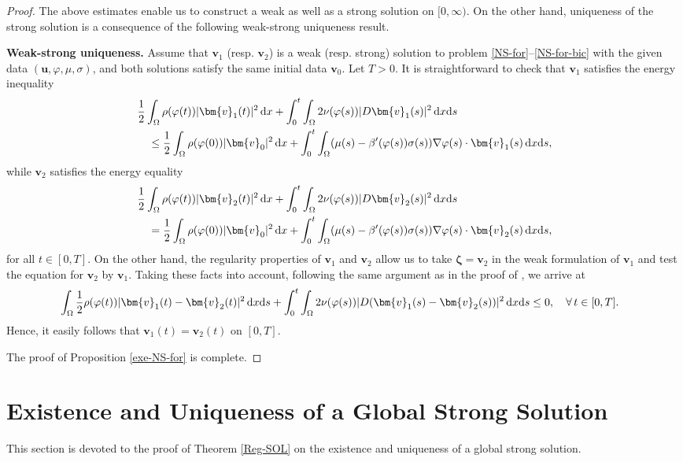 \documentclass[11pt,reqno]{amsart}
\def\d{{\rm d}}
\def\uu{\bm{u}}
\def\vv{\bm{v}}
\begin{document}
\begin{proof}
The above estimates enable us to construct a weak as well as a strong solution on $[0,\infty)$.
On the other hand, uniqueness of the strong solution is a consequence of the following weak-strong uniqueness result.
\smallskip

\textbf{Weak-strong uniqueness.} Assume that $\vv_1$ (resp. $\vv_2$) is a weak (resp. strong) solution to problem \eqref{NS-for}--\eqref{NS-for-bic} with the given data $(\uu,\varphi,\mu,\sigma)$, and both solutions satisfy the same initial data $\vv_0$. Let $T>0$. It is straightforward to check that $\vv_1$ satisfies the energy inequality
%
\begin{align}
&\frac12  \int_\Omega  \rho (\varphi(t))|\vv_1(t)|^2\,\d x
+ \int_0^t \int_\Omega  2\nu(\varphi(s)) |D\bm{v}_1(s)|^2\,\d x\mathrm{d}s
\notag\\
&\quad \leq \frac12  \int_\Omega  \rho (\varphi(0))|\vv_0|^2\,\d x+  \int_0^t\int_\Omega  (\mu(s) -\beta'(\varphi(s)) \sigma(s))\nabla\varphi (s)\cdot \vv_1(s)\, \d x\mathrm{d}s,
\notag
\end{align}
%
while $\vv_2$ satisfies the energy equality
%
\begin{align}
&\frac12  \int_\Omega  \rho (\varphi(t))|\vv_2(t)|^2\,\d x
+ \int_0^t \int_\Omega  2\nu(\varphi(s)) |D\bm{v}_2(s)|^2\,\d x\mathrm{d}s
\notag\\
&\quad
= \frac12  \int_\Omega  \rho (\varphi(0))|\vv_0|^2\,\d x+ \int_0^t\int_\Omega   (\mu(s) -\beta'(\varphi(s)) \sigma(s))\nabla\varphi(s) \cdot \vv_2(s)\, \d x\mathrm{d}s,
\notag
\end{align}
%
for all $t\in [0,T]$.
On the other hand, the regularity properties of $\vv_1$ and $\vv_2$ allow us to take $\bm{\zeta}=\vv_2$ in the weak formulation of $\vv_1$ and test the equation for $\vv_2$ by $\vv_1$. Taking these facts into account, following the same argument as in the proof of \cite[Theorem 4.1]{AGG2023}, we arrive at
%
\begin{align}
&\int_\Omega \frac12\rho(\varphi(t))|\vv_1(t)-\vv_2(t)|^2\,\d x\d s
+ \int_0^t\int_\Omega 2\nu(\varphi(s))|D(\vv_1(s)-\vv_2(s))|^2\,\d x\d s
\leq 0, \quad \forall\, t\in [0,T].
\notag
\end{align}
%
Hence, it easily follows that $\vv_1(t)=\vv_2(t)$ on $[0,T]$.

The proof of Proposition \ref{exe-NS-for} is complete.
\end{proof}


\section{Existence and Uniqueness of a Global Strong Solution}
\label{glo-strong}
\setcounter{equation}{0}
This section is devoted to the proof of Theorem \ref{Reg-SOL} on the existence and uniqueness of a global strong solution.
\end{document}
